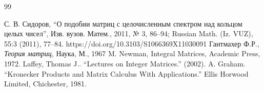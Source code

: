 \documentclass[11pt, a4paper]{article}
\begin{document}
\newpage
\begin{thebibliography}{99}

    С. В. Сидоров, “О подобии матриц с целочисленным спектром над кольцом целых чисел”, 
    Изв. вузов. Матем., 2011, № 3, 86–94; Russian Math. (Iz. VUZ), 55:3 (2011), 77–84. https://doi.org/10.3103/S1066369X11030091
    Гантмахер Ф.Р., \emph{Теория матриц}, Наука, М., 1967
    M. Newman, Integral Matrices, Academic Press, 1972.
    Laffey, Thomas J.. “Lectures on Integer Matrices.” (2002).
    A. Graham. ``Kronecker Products and Matrix Calculus With Applications.''
    Ellis Horwood Limited, Chichester, 1981.



\end{thebibliography}
\end{document}
